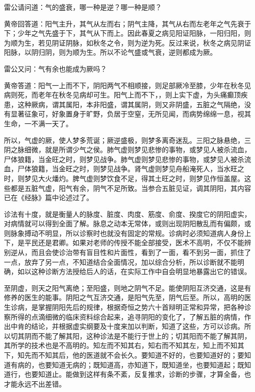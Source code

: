 \documentclass[a4paper,12pt,UTF8,twoside]{ctexbook}
\begin{document}
雷公请问道：气的盛衰，哪一种是逆？哪一种是顺？

黄帝回答道：阳气主升，其气从左而右；阴气主降，其气从右而左老年之气先衰于下；少年之气先盛于下，其气从下而上。因此春夏之病见阳证阳脉，一阳归阳，则为顺为生，若见阴证阴脉，如秋冬之令，则为逆为死。反过来说，秋冬之病见阴证阳脉，以阴归阴，则为顺为生。所以不论气盛或气衰，逆则都成为厥。

雷公又问：气有余也能成为厥吗？

黄帝答道：阳气一上而不下，阴阳两气不相顺接，则足部厥冷至膝，少年在秋冬见病则死，而老年在秋冬见病却可生。阳气上而不下，，则上实下虚，为头痛癫顶疾患，这种厥病，谓其属阳，本非阳盛，谓其属阴，则又非阴盛，五脏之气隔绝，没有显著征象可，好象置身于旷野，负居于空窒，无所见闻，而病势绵绵一息，视其生命，一不满一天了。

所以，气虚的厥，使人梦多荒诞；厥逆盛极，则梦多离奇迷乱。三阳之脉悬绝，三阴之脉细微，就是所谓少气之侯。肺气虚则梦见悲惨的事物，或梦见人被杀流血，尸体狼籍，当金旺之时，则梦见战争。肺气虚则梦见悲惨的事物，或梦见人被杀流血，尸体狼籍，当金旺之时，则梦见战争。肾气虚则梦见舟船淹死人，当水旺之时，则梦见大火燔灼。脾气虚则梦饮食不足，得其土旺之时，则梦见作恒盖屋。这些都是五脏气虚，阳气有余，阴气不足所致。当参合五脏见证，调其阴阳，其内容已在《经脉》篇中论述过了。

诊法有十度，就是衡量人的脉度、脏度、肉度、筋度、俞度、揆度它的阴阳虚实，对病情就可以得到全面了解。脉息之动本无常体，或则出现阴阳散乱而有偏颇，或则脉象搏动不明显，所以诊察时也就没有固定的常规。诊病时必须知道病人身份上下，是平民还是君卿。如果对老师的传授不能全部接受，医术不高明，不仅不能辨别逆从，而且会使诊治带有盲目性和片面性，看到了一面，看不到另一面，抓住了一点，放弃了另一点，不知道结合全面情况，加以综合分析，所以诊断就不能明确，如以这种诊断方法授给后人的话，在实际工作中自会明显地暴露出它的错误。

至阴虚，则天之阳气离绝；至阳盛，则地之阴气不足。能使阴阳互济交通，这是有修养的医生的能事。阴阳之气互济交通，是阳气先至，阴气后至。所以，高明的医生诊病，是掌握阴阳先后的规律，根据奇恒之势六十首辩明正常和异常，把各种诊察所得的点滴细微的临床资料综合起来，追寻阴阳的变化了，了解五脏的病情，作出中肯的结论，并根据虚实纲要及十度来加以判断，知道了这些，方可以诊病。所以切其阴而不能了解其阳，这种诊法是不能行于世上的；切其阳而不能了解其阴，其所学的技术也是不高明的。知左而不知其右，知右而不知其左，知上而不知其下，知先而不知其后，他的医道就不会长久。要知道不好的，也要知道好的；要知道有病的，也要知道无病的；既知道高，亦知道下，既知道坐，也要知道起；既知道行，也要知道止。能做到这样有条不紊，反复推求，诊断的步骤，才算全备，也才能永远不出差错。
\end{document}
